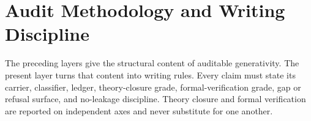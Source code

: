 \section{Audit Methodology and Writing Discipline}
\label{sec:visions-philosophy-audit-methodology}

The preceding layers give the structural content of auditable
generativity. The present layer turns that content into writing rules.
Every claim must state its carrier, classifier, ledger, theory-closure
grade, formal-verification grade, gap or refusal surface, and
no-leakage discipline. Theory closure and formal verification are
reported on independent axes and never substitute for one another.






